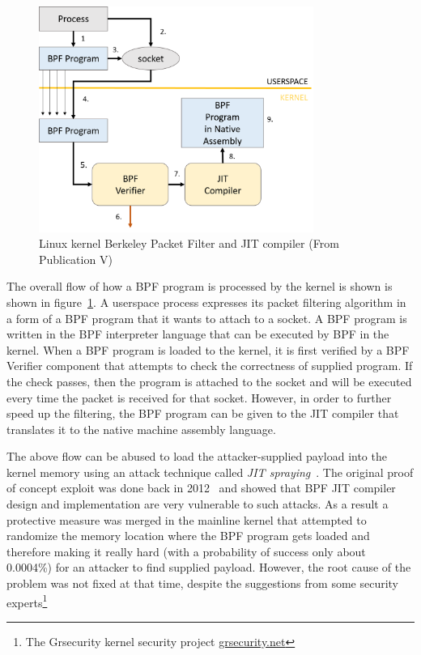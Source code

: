 \begin{figure}[t]
	\centering
		\includegraphics[width=0.80\textwidth]{figures/bpf-overview.png}
	\caption{Linux kernel Berkeley Packet Filter and JIT compiler (From Publication V)}
	\label{fig:bpf-overview}
\end{figure}

The overall flow of how a BPF program is processed by the kernel is shown is shown in figure~\ref{fig:bpf-overview}.  
A userspace process expresses its packet filtering algorithm in a form of a BPF program that it wants to attach to a socket. A BPF program is written in the BPF interpreter language that can be executed by BPF in the kernel. When a BPF program is loaded to the kernel, it is first verified by a BPF Verifier component that attempts to check the correctness of supplied program. If the check passes, then the program is attached to the socket and will be executed every time the packet is received for that socket. However, in order to further speed up the filtering, the BPF program can be given to the JIT compiler that translates it to the native machine assembly language. 

The above flow can be abused to load the attacker-supplied payload into the kernel memory using an attack technique called \textit{JIT spraying}~\cite{blazakis2010, bania2010jit}. The original proof of concept exploit was done back in 2012~\cite{mcallister2012attacking} and showed that BPF JIT compiler design and implementation are very vulnerable to such attacks. As a result a protective measure was merged in the mainline kernel that attempted to randomize the memory location where the BPF program gets loaded and therefore making it really hard (with a probability of success only about 0.0004\%) for an attacker to find supplied payload. However, the root cause of the problem was not fixed at that time, despite the suggestions from some security experts\footnote{The Grsecurity kernel security project \url{grsecurity.net}} 


